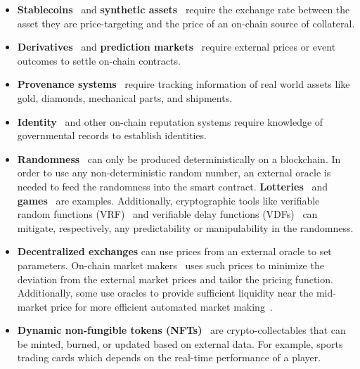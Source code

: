 \begin{itemize}

\item \textbf{Stablecoins}~\cite{clark2019sok,MSS20,PHP+19,gu2020empirical,MAKERDAOOracle} and \textbf{synthetic assets}~\cite{SCM21} require the exchange rate between the asset they are price-targeting and the price of an on-chain source of collateral. 
\item \textbf{Derivatives}~\cite{eskandari2017feasibility,biryukov2017findel,synthetix} and \textbf{prediction markets}~\cite{clark2014decentralizing,peterson2015augur} require external prices or event outcomes to settle on-chain contracts.
\item \textbf{Provenance systems}~\cite{RKYCC20,tian2016agri} require tracking information of real world assets like gold, diamonds, mechanical parts, and shipments.
\item \textbf{Identity}~\cite{KL17,maram2021candid} and other on-chain reputation systems require knowledge of governmental records to establish identities.
\item \textbf{Randomness}~\cite{chainlinkvrf} can only be produced deterministically on a blockchain. In order to use any non-deterministic random number, an external oracle is needed to feed the randomness into the smart contract. \textbf{Lotteries}~\cite{pooltogether} and \textbf{games}~\cite{etheroll} are examples. Additionally, cryptographic tools like verifiable random functions (VRF)~\cite{micali1999verifiable,goldbe-vrf-01} and verifiable delay functions (VDFs)~\cite{bunz2017proofs,crypto-2018-28858} can mitigate, respectively, any predictability or manipulability in the randomness.
\item \textbf{Decentralized exchanges} can use prices from an external oracle to set parameters. On-chain market makers~\cite{hertzog2017bancor} uses such prices to minimize the deviation from the external market prices and tailor the pricing function. Additionally, some use oracles to provide sufficient liquidity near the mid-market price for more efficient automated market making~\cite{dodopmm,cofixwhitepaper,cofixblog}.
\item \textbf{Dynamic non-fungible tokens (NFTs)}~\cite{chainlinknft} are crypto-collectables that can be minted, burned, or updated based on external data. For example, sports trading cards which depends on the real-time performance of a player.
\end{itemize}




